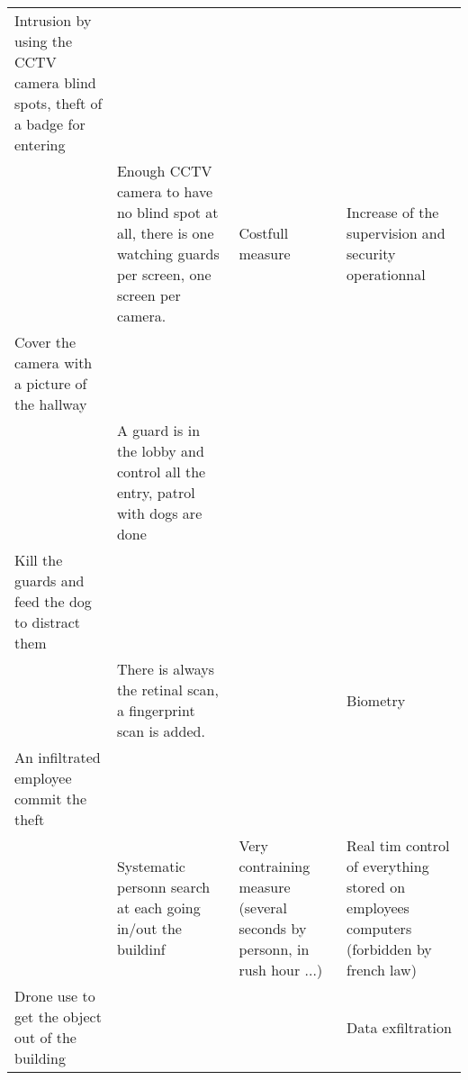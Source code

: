 \documentclass[11pt]{article} %
\begin{document}
\begin{longtable}{|p{3cm}|p{3cm}|p{3cm}|p{3cm}|}
Intrusion by using the CCTV camera blind spots, theft of a badge for entering & & & \\
& Enough CCTV camera to have no blind spot at all, there is one watching
 guards per screen, one screen per camera. & Costfull measure 
 & Increase of the supervision and security operationnal \\
Cover the camera with a picture of the hallway & & & \\
& A guard is in the lobby and control all the entry, patrol with dogs are done && \\
Kill the guards and feed the dog to distract them & & & \\
& There is always the retinal scan, a fingerprint scan is added. & & Biometry \\
 An infiltrated employee commit the theft & & & \\
& Systematic personn search at each going in/out the buildinf &
Very contraining measure (several seconds by personn, in rush hour ...) &
Real tim control of everything stored on employees computers (forbidden by 
french law) \\
Drone use to get the object out of the building & & & Data exfiltration \\

\end{longtable}
\end{document}
